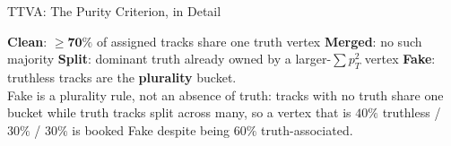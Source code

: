 \documentclass[xcolor=table,aspectratio=169]{beamer}
\begin{document}
\begin{frame}{TTVA: The Purity Criterion, in Detail}
\begin{center}
{}
    \end{center}
    \vspace{-0.3em}
    {\scriptsize \textbf{Clean}: $\mathbf{\geq70\%}$ of assigned tracks share one truth vertex \;\textbullet\;
    \textbf{Merged}: no such majority \;\textbullet\;
    \textbf{Split}: dominant truth already owned by a larger-$\sum p_T^2$ vertex \;\textbullet\;
    \textbf{Fake}: truthless tracks are the \textbf{plurality} bucket.}\\[1pt]
    {\scriptsize\textcolor{black!55}{Fake is a plurality rule, not an absence of truth:
    tracks with no truth share one bucket while truth tracks split across many, so a
    vertex that is $40\%$ truthless / $30\%$ / $30\%$ is booked Fake despite being
    $60\%$ truth-associated.}}
\end{frame}
\end{document}
